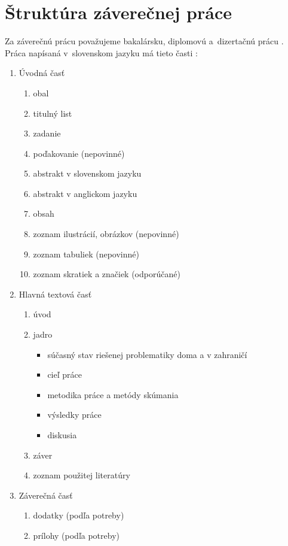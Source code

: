 \chapter{Štruktúra záverečnej práce}\label{sec:StrukturaPrace}
Za záverečnú prácu považujeme bakalársku, diplomovú
a~dizertačnú prácu \cite{zakon1312002}.
Práca napísaná v~slovenskom jazyku má tieto časti \cite{vyhlaska2332011, usmernenie562011}:
\begin{enumerate}
    \item Úvodná časť
    \begin{enumerate}
        \item obal
        \item titulný list
        \item zadanie
        \item poďakovanie (nepovinné)
        \item abstrakt v slovenskom jazyku
        \item abstrakt v anglickom jazyku
        \item obsah
        \item zoznam ilustrácií, obrázkov (nepovinné)
        \item zoznam tabuliek (nepovinné)
        \item zoznam skratiek a značiek (odporúčané)
    \end{enumerate}
    \item Hlavná textová časť
    \begin{enumerate}
        \item úvod
        \item jadro
        \begin{itemize}
            \item súčasný stav riešenej problematiky doma a v zahraničí
            \item cieľ práce
            \item metodika práce a metódy skúmania
            \item výsledky práce
            \item diskusia
        \end{itemize}
        \item záver
        \item zoznam použitej literatúry
    \end{enumerate}
    \item Záverečná časť
    \begin{enumerate}
        \item dodatky (podľa potreby)
        \item prílohy (podľa potreby)
    \end{enumerate}
\end{enumerate}

